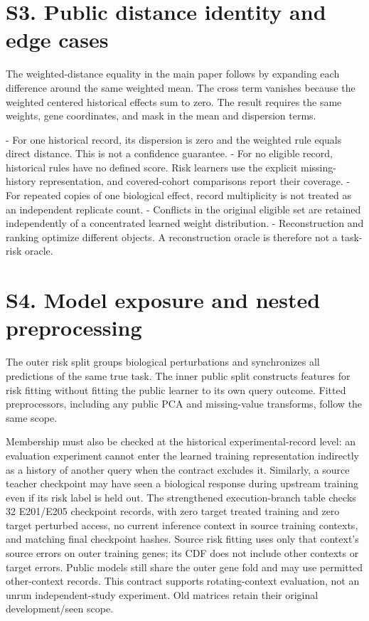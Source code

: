 \documentclass[journal,onecolumn]{IEEEtran}
\begin{document}
\section{S3. Public distance identity and edge cases}

The weighted-distance equality in the main paper follows by expanding each difference around the same weighted mean. The cross term vanishes because the weighted centered historical effects sum to zero. The result requires the same weights, gene coordinates, and mask in the mean and dispersion terms.


- For one historical record, its dispersion is zero and the weighted rule equals direct distance. This is not a confidence guarantee. - For no eligible record, historical rules have no defined score. Risk learners use the explicit missing-history representation, and covered-cohort comparisons report their coverage. - For repeated copies of one biological effect, record multiplicity is not treated as an independent replicate count. - Conflicts in the original eligible set are retained independently of a concentrated learned weight distribution. - Reconstruction and ranking optimize different objects. A reconstruction oracle is therefore not a task-risk oracle.


\section{S4. Model exposure and nested preprocessing}

The outer risk split groups biological perturbations and synchronizes all predictions of the same true task. The inner public split constructs features for risk fitting without fitting the public learner to its own query outcome. Fitted preprocessors, including any public PCA and missing-value transforms, follow the same scope.


Membership must also be checked at the historical experimental-record level: an evaluation experiment cannot enter the learned training representation indirectly as a history of another query when the contract excludes it. Similarly, a source teacher checkpoint may have seen a biological response during upstream training even if its risk label is held out. The strengthened execution-branch table \texttt{} checks 32 E201/E205 checkpoint records, with zero target treated training and zero target perturbed access, no current inference context in source training contexts, and matching final checkpoint hashes. Source risk fitting uses only that context's source errors on outer training genes; its CDF does not include other contexts or target errors. Public models still share the outer gene fold and may use permitted other-context records. This contract supports rotating-context evaluation, not an unrun independent-study experiment. Old matrices retain their original development/seen scope.
\end{document}
